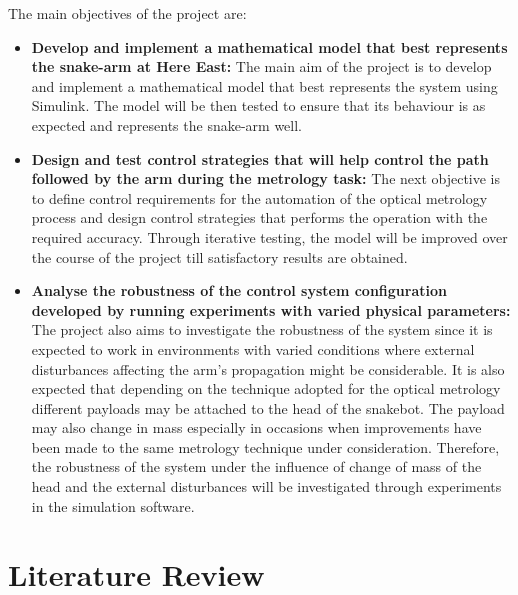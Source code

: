 \documentclass[a4paper,12pt]{report}
\begin{document}
The main objectives of the project are:
\begin{itemize}
	\item \textbf{Develop and implement a mathematical model that best represents the snake-arm at Here East:} The main aim of the project is to develop and implement a mathematical model that best represents the system using Simulink. The model will be then tested to ensure that its behaviour is as expected and represents the snake-arm well.
	\item \textbf{Design and test control strategies that will help control the path followed by the arm during the metrology task:} The next objective is to define control requirements for the automation of the optical metrology process and design control strategies that performs the operation with the required accuracy. Through iterative testing, the model will be improved over the course of the project till satisfactory results are obtained.
	\item \textbf{Analyse the robustness of the control system configuration developed by running experiments with varied physical parameters:} The project also aims to investigate the robustness of the system since it is expected to work in environments with varied conditions where external disturbances affecting the arm’s propagation might be considerable. It is also expected that depending on the technique adopted for the optical metrology different payloads may be attached to the head of the snakebot. The payload may also change in mass especially in occasions when improvements have been made to the same metrology technique under consideration. Therefore, the robustness of the system under the influence of change of mass of the head and the external disturbances will be investigated through experiments in the simulation software.
\end{itemize}

\section{Literature Review}
\end{document}
